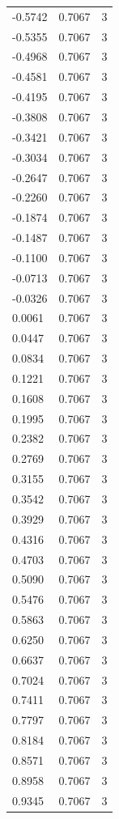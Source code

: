 \begin{longtable}{lrr}
  -0.5742 & 0.7067 & 3 \\
  -0.5355 & 0.7067 & 3 \\
  -0.4968 & 0.7067 & 3 \\
  -0.4581 & 0.7067 & 3 \\
  -0.4195 & 0.7067 & 3 \\
  -0.3808 & 0.7067 & 3 \\
  -0.3421 & 0.7067 & 3 \\
  -0.3034 & 0.7067 & 3 \\
  -0.2647 & 0.7067 & 3 \\
  -0.2260 & 0.7067 & 3 \\
  -0.1874 & 0.7067 & 3 \\
  -0.1487 & 0.7067 & 3 \\
  -0.1100 & 0.7067 & 3 \\
  -0.0713 & 0.7067 & 3 \\
  -0.0326 & 0.7067 & 3 \\
  0.0061 & 0.7067 & 3 \\
  0.0447 & 0.7067 & 3 \\
  0.0834 & 0.7067 & 3 \\
  0.1221 & 0.7067 & 3 \\
  0.1608 & 0.7067 & 3 \\
  0.1995 & 0.7067 & 3 \\
  0.2382 & 0.7067 & 3 \\
  0.2769 & 0.7067 & 3 \\
  0.3155 & 0.7067 & 3 \\
  0.3542 & 0.7067 & 3 \\
  0.3929 & 0.7067 & 3 \\
  0.4316 & 0.7067 & 3 \\
  0.4703 & 0.7067 & 3 \\
  0.5090 & 0.7067 & 3 \\
  0.5476 & 0.7067 & 3 \\
  0.5863 & 0.7067 & 3 \\
  0.6250 & 0.7067 & 3 \\
  0.6637 & 0.7067 & 3 \\
  0.7024 & 0.7067 & 3 \\
  0.7411 & 0.7067 & 3 \\
  0.7797 & 0.7067 & 3 \\
  0.8184 & 0.7067 & 3 \\
  0.8571 & 0.7067 & 3 \\
  0.8958 & 0.7067 & 3 \\
  0.9345 & 0.7067 & 3 \\

\end{longtable}
